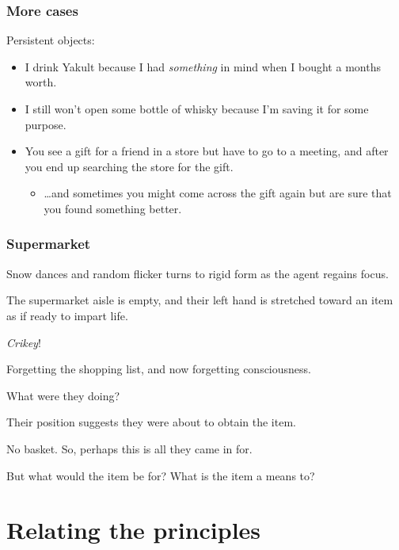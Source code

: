 \documentclass[noamssymb,
]{beamer} %
\begin{document}
\begin{frame}
  \frametitle{More cases}

  Persistent objects:
\begin{itemize}
\item I drink Yakult because I had \emph{something} in mind when I bought a months worth.
\item I still won't open some bottle of whisky because I'm saving it for some purpose.
\item You see a gift for a friend in a store but have to go to a meeting, and after you end up searching the store for the gift.
  \begin{itemize}
  \item \dots and sometimes you might come across the gift again but are sure that you found something better.
  \end{itemize}
\end{itemize}
\end{frame}


\begin{frame}
  \frametitle{Supermarket}

  {\rmfamily

    Snow dances and random flicker turns to rigid form as the agent regains focus.

    The supermarket aisle is empty, and their left hand is stretched toward an item as if ready to impart life.

    \emph{Crikey}!

    Forgetting the shopping list, and now forgetting consciousness.

    What were they doing?

    Their position suggests they were about to obtain the item.

    No basket. So, perhaps this is all they came in for.

    But what would the item be for?  What is the item a means to?

  }
\end{frame}

\section{Relating the principles}
\end{document}
